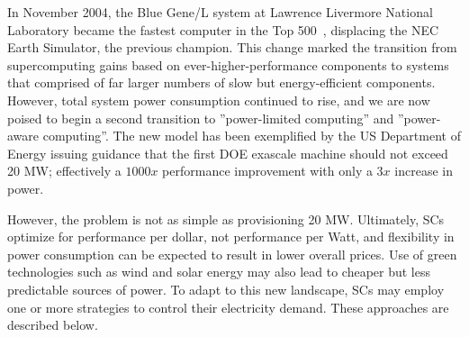 In November 2004, the Blue Gene/L system at Lawrence Livermore National Laboratory
became the fastest computer in the Top 500~\cite{Top500}, displacing the NEC Earth Simulator,
the previous champion. This change marked the transition from supercomputing gains based
on ever-higher-performance components to systems that comprised of far larger numbers of 
slow but energy-efficient components. However, total system power consumption continued to rise,
and we are now poised to begin a second transition to ''power-limited computing'' and ''power-aware computing''. The new
model has been exemplified by the US Department of Energy issuing guidance that the first
DOE exascale machine should not exceed 20 MW; effectively a $1000x$ performance improvement
with only a $3x$ increase in power. 

However, the problem is not as simple as provisioning 20 MW. Ultimately, SCs optimize for
performance per dollar, not performance per Watt, and flexibility in power consumption
can be expected to result in lower overall prices. Use of green technologies such as
wind and solar energy may also lead to cheaper but less predictable sources of power.
To adapt to this new landscape, SCs may employ one or more strategies to control their 
electricity demand. These approaches are described below.


